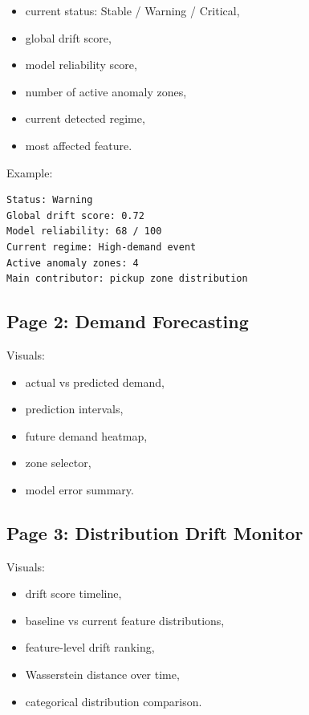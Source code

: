 \documentclass[11pt]{article}
\begin{document}
\begin{itemize}
    \item current status: Stable / Warning / Critical,
    \item global drift score,
    \item model reliability score,
    \item number of active anomaly zones,
    \item current detected regime,
    \item most affected feature.
\end{itemize}

Example:

\begin{lstlisting}
Status: Warning
Global drift score: 0.72
Model reliability: 68 / 100
Current regime: High-demand event
Active anomaly zones: 4
Main contributor: pickup zone distribution
\end{lstlisting}

\subsection{Page 2: Demand Forecasting}

Visuals:

\begin{itemize}
    \item actual vs predicted demand,
    \item prediction intervals,
    \item future demand heatmap,
    \item zone selector,
    \item model error summary.
\end{itemize}

\subsection{Page 3: Distribution Drift Monitor}

Visuals:

\begin{itemize}
    \item drift score timeline,
    \item baseline vs current feature distributions,
    \item feature-level drift ranking,
    \item Wasserstein distance over time,
    \item categorical distribution comparison.
\end{itemize}
\end{document}
